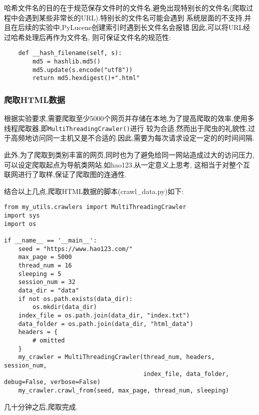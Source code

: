 \documentclass[a4paper]{article}
\begin{document}
哈希文件名的目的在于规范保存文件时的文件名,避免出现特别长的文件名(爬取过程中会遇到某些非常长的URL).特别长的文件名可能会遇到
系统层面的不支持,并且在后续的实验中,PyLucene创建索引时遇到长文件名会报错.因此,可以将URL经过哈希处理后再作为文件名,
则可保证文件名的规范性:
\begin{verbatim}
    def __hash_filename(self, s):
        md5 = hashlib.md5()
        md5.update(s.encode("utf8"))
        return md5.hexdigest()+".html"
\end{verbatim}
        \subsubsection{爬取HTML数据}
根据实验要求,需要爬取至少5000个网页并存储在本地,为了提高爬取的效率,使用多线程爬取器,即\texttt{MultiThreadingCrawler()}进行
较为合适.然而出于爬虫的礼貌性,过于高频地访问同一主机又是不合适的.因此,需要为每次请求设定一定的的时间间隔.

此外,为了爬取到类别丰富的网页,同时也为了避免给同一网站造成过大的访问压力,可以设定爬取起点为导航类网站,如hao123.从一定意义上思考,
这相当于对整个互联网进行了取样,保证了爬取图的连通性.

结合以上几点,爬取HTML数据的脚本(crawl\_data.py)如下:
\begin{verbatim}
from my_utils.crawlers import MultiThreadingCrawler
import sys
import os

if __name__ == '__main__':
    seed = "https://www.hao123.com/"
    max_page = 5000
    thread_num = 16
    sleeping = 5
    session_num = 32
    data_dir = "data"
    if not os.path.exists(data_dir):
        os.mkdir(data_dir)
    index_file = os.path.join(data_dir, "index.txt")
    data_folder = os.path.join(data_dir, "html_data")
    headers = {
        # omitted
    }
    my_crawler = MultiThreadingCrawler(thread_num, headers, session_num,
                                       index_file, data_folder, debug=False, verbose=False)
    my_crawler.crawl_from(seed, max_page, thread_num, sleeping)
\end{verbatim}

几十分钟之后,爬取完成.
\end{document}
